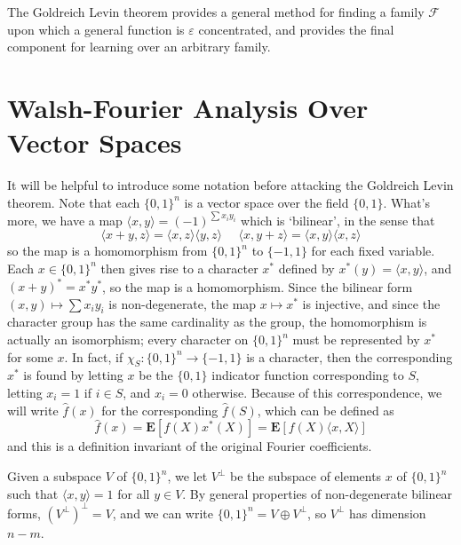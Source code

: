 The Goldreich Levin theorem provides a general method for finding a family $\mathcal{F}$ upon which a general function is $\varepsilon$ concentrated, and provides the final component for learning over an arbitrary family.

\section{Walsh-Fourier Analysis Over Vector Spaces}

It will be helpful to introduce some notation before attacking the Goldreich Levin theorem. Note that each $\{ 0, 1 \}^n$ is a vector space over the field $\{ 0, 1 \}$. What's more, we have a map $\langle x, y \rangle = (-1)^{\sum x_i y_i}$ which is `bilinear', in the sense that
%
\[ \langle x + y, z \rangle = \langle x,z \rangle \langle y, z \rangle\ \ \ \ \ \ \langle x, y + z \rangle = \langle x, y \rangle \langle x, z \rangle \]
%
so the map is a homomorphism from $\{ 0, 1 \}^n$ to $\{ -1, 1 \}$ for each fixed variable. Each $x \in \{ 0, 1 \}^n$ then gives rise to a character $x^*$ defined by $x^*(y) = \langle x, y \rangle$, and $(x + y)^* = x^* y^*$, so the map is a homomorphism. Since the bilinear form $(x,y) \mapsto \sum x_i y_i$ is non-degenerate, the map $x \mapsto x^*$ is injective, and since the character group has the same cardinality as the group, the homomorphism is actually an isomorphism; every character on $\{ 0, 1 \}^n$ must be represented by $x^*$ for some $x$. In fact, if $\chi_S: \{ 0, 1 \}^n \to \{ -1, 1 \}$ is a character, then the corresponding $x^*$ is found by letting $x$ be the $\{ 0, 1 \}$ indicator function corresponding to $S$, letting $x_i = 1$ if $i \in S$, and $x_i = 0$ otherwise. Because of this correspondence, we will write $\widehat{f}(x)$ for the corresponding $\widehat{f}(S)$, which can be defined as
%
\[ \widehat{f}(x) = \mathbf{E}[f(X)x^*(X)] = \mathbf{E}[f(X) \langle x, X \rangle] \]
%
and this is a definition invariant of the original Fourier coefficients.

Given a subspace $V$ of $\{ 0, 1 \}^n$, we let $V^\perp$ be the subspace of elements $x$ of $\{ 0, 1 \}^n$ such that $\langle x, y \rangle = 1$ for all $y \in V$. By general properties of non-degenerate bilinear forms, $(V^\perp)^\perp = V$, and we can write $\{ 0, 1 \}^n = V \oplus V^\perp$, so $V^\perp$ has dimension $n - m$.


